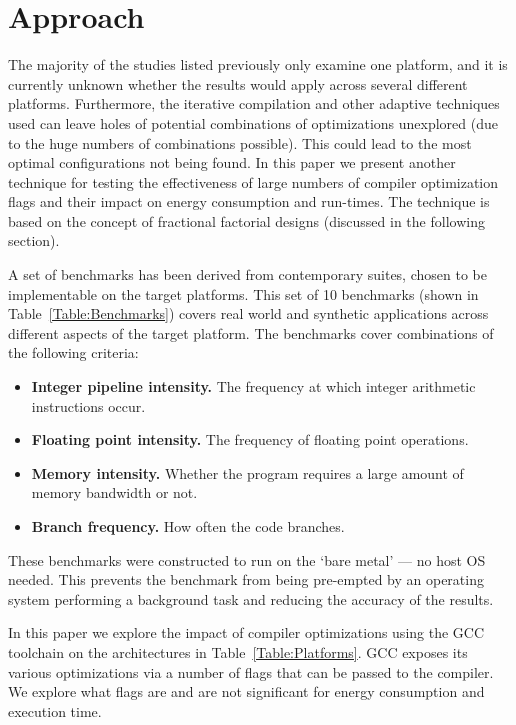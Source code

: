 \documentclass[twocolumn]{article}
\begin{document}
\section{Approach}

The majority of the studies listed previously only examine one platform, and it is currently unknown whether the results would apply across several different platforms. Furthermore, the iterative compilation and other adaptive techniques used can leave holes of potential combinations of optimizations unexplored (due to the huge numbers of combinations possible). This could lead to the most optimal configurations not being found. In this paper we present another technique for testing the effectiveness of large numbers of compiler optimization flags and their impact on energy consumption and run-times. The technique is based on the concept of fractional factorial designs (discussed in the following section).

A set of benchmarks has been derived from contemporary suites, chosen to be implementable on the target platforms. This set of 10 benchmarks (shown in Table~\ref{Table:Benchmarks}) covers real world and synthetic applications across different aspects of the target platform. The benchmarks cover combinations of the following criteria:
\begin{itemize}
	\setlength{\itemsep}{0em}
	\vspace{-1mm}
	\item \textbf{Integer pipeline intensity.} The frequency at which integer arithmetic instructions occur.
	\item \textbf{Floating point intensity.} The frequency of floating point operations.
	\item \textbf{Memory intensity.} Whether the program requires a large amount of memory bandwidth or not.
	\item \textbf{Branch frequency.} How often the code branches.
\end{itemize}

These benchmarks were constructed to run on the `bare metal' --- no host OS needed. This prevents the benchmark from being pre-empted by an operating system performing a background task and reducing the accuracy of the results.


In this paper we explore the impact of compiler optimizations using the GCC toolchain on the architectures in Table~\ref{Table:Platforms}. GCC exposes its various optimizations via a number of flags that can be passed to the compiler. We explore what flags are and are not significant for energy consumption and execution time.
\end{document}
